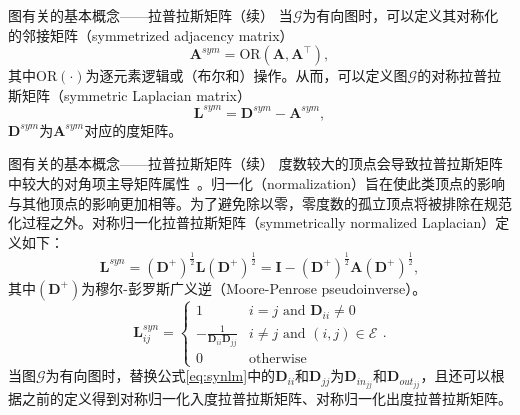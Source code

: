\documentclass{beamer}
\begin{document}
\begin{frame}{图有关的基本概念——拉普拉斯矩阵（续）}
	当$\mathscr{G}$为有向图时，可以定义其对称化的邻接矩阵（symmetrized adjacency matrix）
	\begin{equation}
		\textbf{A}^{sym}=\text{OR}\left(\textbf{A},\textbf{A}^\top\right),
	\end{equation}
	其中$\text{OR}\left(\cdot\right)$为逐元素逻辑或（布尔和）操作。从而，可以定义图$\mathscr{G}$的对称拉普拉斯矩阵（symmetric Laplacian matrix）
	\begin{equation}
		\textbf{L}^{sym}=\textbf{D}^{sym}-\textbf{A}^{sym},
	\end{equation}
	$\textbf{D}^{sym}$为$\textbf{A}^{sym}$对应的度矩阵。
\end{frame}

\begin{frame}{图有关的基本概念——拉普拉斯矩阵（续）}
	度数较大的顶点会导致拉普拉斯矩阵中较大的对角项主导矩阵属​​性~\cite{wiki2024lm}。归一化（normalization）旨在使此类顶点的影响与其他顶点的影响更加相等。为了避免除以零，零度数的孤立顶点将被排除在规范化过程之外。对称归一化拉普拉斯矩阵（symmetrically normalized Laplacian）定义如下：
	\begin{equation}
		\textbf{L}^{syn}=\left(\textbf{D}^+\right)^{\frac{1}{2}}\textbf{L}\left(\textbf{D}^+\right)^{\frac{1}{2}}=\textbf{I}-\left(\textbf{D}^+\right)^{\frac{1}{2}}\textbf{A}\left(\textbf{D}^+\right)^{\frac{1}{2}},
	\end{equation}
	其中$\left(\textbf{D}^+\right)$为穆尔-彭罗斯广义逆（Moore-Penrose pseudoinverse）。
	\begin{equation}
		\label{eq:synlm}
		\textbf{L}^{syn}_{ij}=\left\{\begin{matrix}
		  1	& i=j\,\,\text{and}\,\,\textbf{D}_{ii}\neq0\\
		  -\frac{1}{\textbf{D}_{ii}\textbf{D}_{jj}}	& i\neq j\,\,\text{and}\,\,\left(i,j\right)\in\mathscr{E} \\
		  0	& \text{otherwise}
		\end{matrix}\right..
	\end{equation}
	当图$\mathscr{G}$为有向图时，替换公式\ref{eq:synlm}中的$\textbf{D}_{ii}$和$\textbf{D}_{jj}$为$\textbf{D}_{in_{jj}}$和$\textbf{D}_{out_{jj}}$，且还可以根据之前的定义得到对称归一化入度拉普拉斯矩阵、对称归一化出度拉普拉斯矩阵。
\end{frame}
\end{document}
